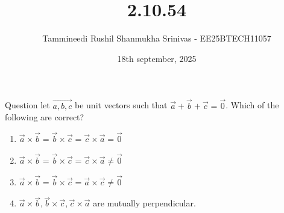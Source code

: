 \documentclass{beamer}
\title{2.10.54}
\date{18th september, 2025}
\author{Tammineedi Rushil Shanmukha Srinivas - EE25BTECH11057}
\begin{document}
\frame{\titlepage}
\begin{frame}{Question}
let $\vec{a, b,c}$ be unit vectors such that $\vec{a}+\vec{b}+\vec{c}=\vec{0}$. Which of the following are correct?\\
\begin{enumerate}
    \item $\vec{a}\times \vec{b}=\vec{b}\times \vec{c}=\vec{c}\times \vec{a}=\vec{0}$
    \item $\vec{a}\times \vec{b}=\vec{b}\times \vec{c}=\vec{c}\times \vec{a}\neq \vec{0}$
    \item $\vec{a}\times \vec{b}=\vec{b}\times \vec{c}=\vec{a}\times \vec{c}\neq \vec{0}$
    \item $\vec{a}\times \vec{b},\vec{b}\times \vec{c}, \vec{c}\times \vec{a}$ are mutually perpendicular.
\end{enumerate}
\end{frame}
\end{document}
